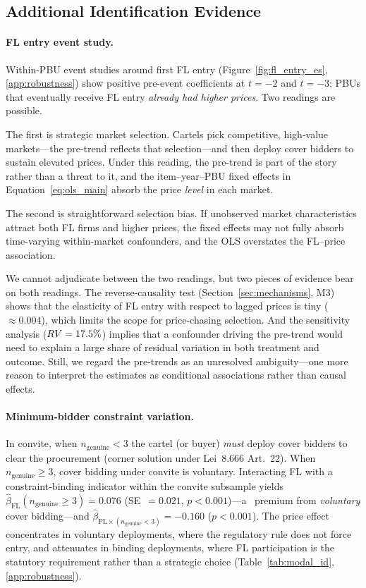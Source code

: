 
\subsection{Additional Identification Evidence}
\label{sec:additional_id}

\paragraph{FL entry event study.}
Within-PBU event studies around first FL entry
(Figure~\ref{fig:fl_entry_es}, \ref{app:robustness}) show
positive pre-event coefficients at $t = -2$ and $t = -3$: PBUs that
eventually receive FL entry \emph{already had higher prices}. Two
readings are possible.

The first is strategic market selection. Cartels pick competitive,
high-value markets---the pre-trend reflects that selection---and then
deploy cover bidders to sustain elevated prices. Under this reading,
the pre-trend is part of the story rather than a threat to it, and
the item--year--PBU fixed effects in Equation~\eqref{eq:ols_main}
absorb the price \emph{level} in each market.

The second is straightforward selection bias. If unobserved market
characteristics attract both FL firms and higher prices, the
fixed effects may not fully absorb time-varying within-market
confounders, and the OLS overstates the FL--price association.

We cannot adjudicate between the two readings, but two pieces of
evidence bear on both readings. The reverse-causality test
(Section~\ref{sec:mechanisms}, M3) shows that the elasticity of FL
entry with respect to lagged prices is tiny ($\approx 0.004$), which
limits the scope for price-chasing selection. And the sensitivity
analysis ($RV = 17.5\%$) implies that a confounder driving the
pre-trend would need to explain a large share of residual variation in
both treatment and outcome. Still, we regard the pre-trends as an
unresolved ambiguity---one more reason to interpret the estimates as
conditional associations rather than causal effects.

\paragraph{Minimum-bidder constraint variation.}
In convite, when $n_{\text{genuine}} < 3$ the cartel (or buyer)
\emph{must} deploy cover bidders to clear the procurement (corner
solution under Lei~8.666 Art.~22). When $n_{\text{genuine}} \geq
3$, cover bidding under convite is voluntary. Interacting FL with
a constraint-binding indicator within the convite subsample
yields $\hat{\beta}_{\text{FL}}(n_{\text{genuine}} \geq 3) =
0.076$ (SE~$= 0.021$, $p < 0.001$)---a \valWelfareConclLow\ premium from
\emph{voluntary} cover bidding---and
$\hat{\beta}_{\text{FL} \times (n_{\text{genuine}} < 3)} = -0.160$
($p < 0.001$). The price effect concentrates in voluntary
deployments, where the regulatory rule does not force entry, and
attenuates in binding deployments, where FL participation is the
statutory requirement rather than a strategic choice
(Table~\ref{tab:modal_id}, \ref{app:robustness}).

